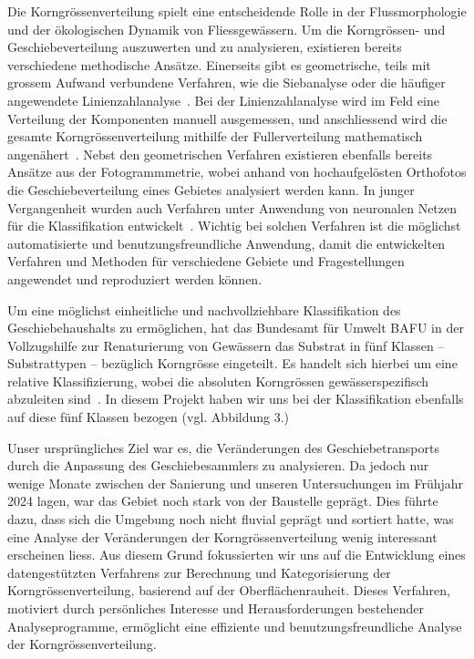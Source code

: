 \documentclass[10pt]{extarticle}
\begin{document}
    Die Korngrössenverteilung spielt eine entscheidende Rolle in der Flussmorphologie und der ökologischen Dynamik von Fliessgewässern.
    Um die Korngrössen- und Geschiebeverteilung auszuwerten und zu analysieren, existieren bereits verschiedene methodische Ansätze.
    Einerseits gibt es geometrische, teils mit grossem Aufwand verbundene Verfahren, wie die Siebanalyse oder die häufiger angewendete Linienzahlanalyse~\parencite{fehrGeschiebeanalysenGebirgsflussenUmrechnung1987}.
    Bei der Linienzahlanalyse wird im Feld eine Verteilung der Komponenten manuell ausgemessen, und anschliessend wird die gesamte Korngrössenverteilung mithilfe der Fullerverteilung mathematisch angenähert~\parencite{fehrEinfacheBestimmungKorngroessenverteilung1987}.
    Nebst den geometrischen Verfahren existieren ebenfalls bereits Ansätze aus der Fotogrammmetrie, wobei anhand von hochaufgelösten Orthofotos die Geschiebeverteilung eines Gebietes analysiert werden kann.
    In junger Vergangenheit wurden auch Verfahren unter Anwendung von neuronalen Netzen für die Klassifikation entwickelt~\parencite[vgl.]{keuschSubstratkartierungAlpinenOekosystemen2023}.
    Wichtig bei solchen Verfahren ist die möglichst automatisierte und benutzungsfreundliche Anwendung, damit die entwickelten Verfahren und Methoden für verschiedene Gebiete und Fragestellungen angewendet und reproduziert werden können.

    Um eine möglichst einheitliche und nachvollziehbare Klassifikation des Geschiebehaushalts zu ermöglichen, hat das Bundesamt für Umwelt BAFU in der Vollzugshilfe zur Renaturierung von Gewässern das Substrat in fünf Klassen – Substrattypen – bezüglich Korngrösse eingeteilt.
    Es handelt sich hierbei um eine relative Klassifizierung, wobei die absoluten Korngrössen gewässerspezifisch abzuleiten sind~\parencite{nitscheGeschiebehaushaltMassnahmen2024}.
    In diesem Projekt haben wir uns bei der Klassifikation ebenfalls auf diese fünf Klassen bezogen (vgl. Abbildung 3.) %

    Unser ursprüngliches Ziel war es, die Veränderungen des Geschiebetransports durch die Anpassung des Geschiebesammlers zu analysieren.
    Da jedoch nur wenige Monate zwischen der Sanierung und unseren Untersuchungen im Frühjahr 2024 lagen, war das Gebiet noch stark von der Baustelle geprägt.
    Dies führte dazu, dass sich die Umgebung noch nicht fluvial geprägt und sortiert hatte, was eine Analyse der Veränderungen der Korngrössenverteilung wenig interessant erscheinen liess.
    Aus diesem Grund fokussierten wir uns auf die Entwicklung eines datengestützten Verfahrens zur Berechnung und Kategorisierung der Korngrössenverteilung, basierend auf der Oberflächenrauheit.
    Dieses Verfahren, motiviert durch persönliches Interesse und Herausforderungen bestehender Analyseprogramme, ermöglicht eine effiziente und benutzungsfreundliche Analyse der Korngrössenverteilung.
\end{document}
